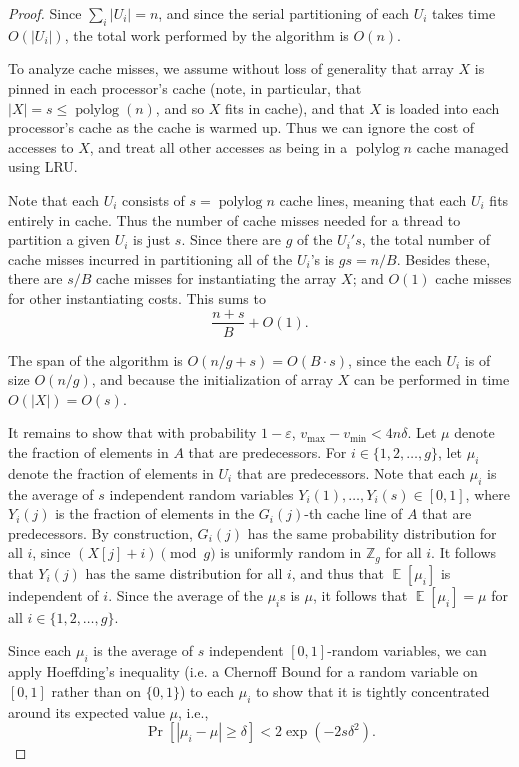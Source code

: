 \documentclass[a4paper,UKenglish,cleveref, autoref, thm-restate]{lipics-v2019}
\renewcommand{\epsilon}{\varepsilon}
\DeclareMathOperator{\E}{\mathbb{E}}
\DeclareMathOperator{\polylog}{\text{polylog}}
\def\E{\operatorname{\mathbb{E}}}
\begin{document}
\begin{proof}
Since $\sum_i |U_i| = n$, and since the serial partitioning of each $U_i$
takes time $O(|U_i|)$, the total work performed by the algorithm is
$O(n)$.

To analyze cache misses, we assume without loss of generality that
array $X$ is pinned in each processor's cache (note, in particular,
that $|X| = s \le \polylog(n)$, and so $X$ fits in cache), and that
$X$ is loaded into each processor's cache as the cache is warmed
up. Thus we can ignore the cost of accesses to $X$, and treat all
other accesses as being in a $\polylog n$ cache managed using
LRU.

Note that each $U_i$ consists of $s = \polylog n$ cache lines,
meaning that each $U_i$ fits entirely in cache. Thus the number of
cache misses needed for a thread to partition a given $U_i$ is just
$s$. Since there are $g$ of the $U_i's$, the total number of cache
misses incurred in partitioning all of the $U_i$'s is $g s =
n/B$. Besides these, there are $s/B$ cache misses for instantiating
the array $X$; and $O(1)$ cache misses for other instantiating
costs. This sums to $$\frac{n+s}{B}+O(1).$$

The span of the algorithm is $O(n/g + s) = O(B\cdot s)$, since the
each $U_i$ is of size $O(n / g)$, and because the initialization of
array $X$ can be performed in time $O(|X|) = O(s)$.

It remains to show that with probability $1-\epsilon$, $v_{\text{max}}
- v_{\text{min}} < 4n\delta$. Let $\mu$ denote the fraction of
elements in $A$ that are predecessors. For $i \in \{1, 2, \ldots,
g\}$, let $\mu_i$ denote the fraction of elements in $U_i$ that are
predecessors. Note that each $\mu_i$ is the average of $s$ independent
random variables $Y_i(1), \ldots, Y_i(s) \in [0, 1]$, where $Y_i(j)$
is the fraction of elements in the $G_i(j)$-th cache line of $A$ that
are predecessors. By construction, $G_i(j)$ has the same probability
distribution for all $i$, since $(X[j] + i) \pmod g$ is uniformly
random in $\mathbb{Z}_g$ for all $i$. It follows that $Y_i(j)$ has the
same distribution for all $i$, and thus that $\E[\mu_i]$ is
independent of $i$. Since the average of the $\mu_i$s is $\mu$, it
follows that $\E[\mu_i] = \mu$ for all $i \in \{1, 2, \ldots, g\}$.

Since each $\mu_i$ is the average of $s$ independent $[0, 1]$-random
variables, we can apply Hoeffding's inequality (i.e. a Chernoff Bound
for a random variable on $[0,1]$ rather than on $\{0,1\}$) to each
$\mu_i$ to show that it is tightly concentrated around its expected
value $\mu$, i.e.,
$$\Pr[|\mu_i - \mu| \geq \delta] < 2\exp(-2s\delta^2). $$


\end{proof}
\end{document}
